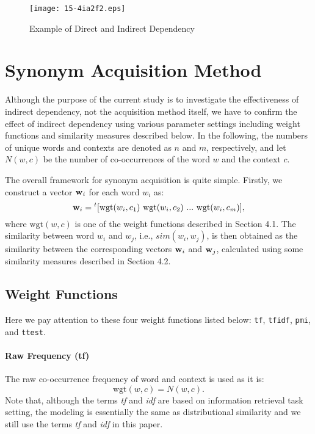 \documentclass[english]{jnlp_1.4}
\begin{document}
\begin{figure}[t]
\begin{center}
\texttt{[image: 15-4ia2f2.eps]}
\caption{Example of Direct and Indirect Dependency}
\label{fig_dd_example}
\end{center}
\end{figure}

\section{Synonym Acquisition Method}

Although the purpose of the current study is to investigate the
effectiveness of indirect dependency, not the acquisition method
itself, we have to confirm the effect of indirect dependency using
various parameter settings including weight functions and similarity
measures described below. In the following, the numbers of unique
words and contexts are denoted as $n$ and $m$, respectively, and let
$N(w, c)$ be the number of co-occurrences of the word $w$ and the
context $c$.

The overall framework for synonym acquisition is quite
simple. Firstly, we construct a vector ${\bf w}_i$ for each word $w_i$
as:
\[
{\bf w}_i = {}^t[\mbox{wgt}(w_i, c_1)\ \mbox{wgt}(w_i, c_2)\  ...\ \mbox{wgt}(w_i, c_m)],
\]
where $\mbox{wgt}(w, c)$ is one of the weight functions described in
Section 4.1. The similarity between word $w_i$ and $w_j$, i.e.,
$sim(w_i, w_j)$, is then obtained as the similarity between the
corresponding vectors ${\bf w}_i$ and ${\bf w}_j$, calculated using
some similarity measures described in Section 4.2.

\subsection{Weight Functions}

Here we pay attention to these four weight functions listed below: \verb|tf|,
\verb|tfidf|, \verb|pmi|, and \verb|ttest|.

\paragraph{Raw Frequency (tf)} \quad

The raw co-occurrence frequency of word and context is used as it is:
\[
\mbox{wgt}(w, c) = N(w, c).
\]
Note that, although the terms {\em tf} and {\em idf} are based on
information retrieval task setting, the modeling is essentially the
same as distributional similarity and we still use the terms {\em tf}
and {\em idf} in this paper.
\end{document}
